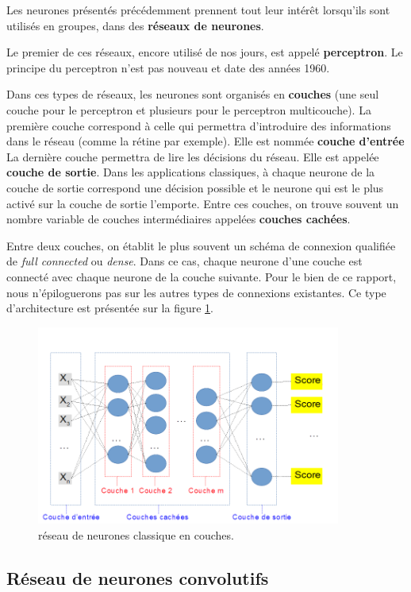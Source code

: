 Les neurones présentés précédemment prennent tout leur intérêt lorsqu'ils sont utilisés en groupes, dans des \textbf{réseaux de neurones}.

Le premier de ces réseaux, encore utilisé de nos jours, est appelé \textbf{perceptron}.
Le principe du perceptron n'est pas nouveau et date des années 1960.

Dans ces types de réseaux, les neurones sont organisés en \textbf{couches} (une seul couche pour le perceptron et plusieurs pour le perceptron multicouche).
La première couche correspond à celle qui permettra d'introduire des informations dans le réseau (comme la rétine par exemple). Elle est nommée \textbf{couche d'entrée}
La dernière couche permettra de lire les décisions du réseau. Elle est appelée \textbf{couche de sortie}. Dans les applications classiques, à chaque neurone de la couche de sortie correspond une décision possible et le neurone qui est le plus activé sur la couche de sortie l'emporte.
Entre ces couches, on trouve souvent un nombre variable de couches intermédiaires appelées \textbf{couches cachées}.

Entre deux couches, on établit le plus souvent un schéma de connexion qualifiée
de \textit{full connected} ou \textit{dense}.
Dans ce cas, chaque neurone d'une couche est connecté avec chaque neurone de la
couche suivante. Pour le bien de ce rapport, nous n'épiloguerons pas sur les autres
types de connexions existantes. Ce type d'architecture est présentée sur la figure \ref{reseauClassique}.

\begin{figure}[h]
\centering
\includegraphics[width=10cm]{./images/multicouche.png}
\caption{réseau de neurones classique en couches.%
\label{reseauClassique}}
\end{figure}


\hypertarget{Ruxe9seau-de-neurones-convolutif}{%
\subsection{Réseau de neurones convolutifs}
\label{Ruxe9seau-de-neurones-convolutif}}

